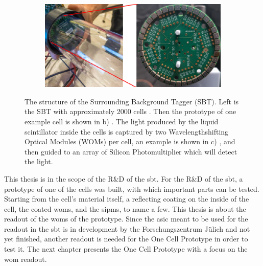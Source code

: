 \begin{figure}
\begin{subfigure}[b]{0.24\textwidth}
		\caption{}
		\label{fig:sbt_structure_cell}
	\end{subfigure}
	\begin{subfigure}[b]{0.42\textwidth}
		\centering
		\includegraphics[width=1.\textwidth]{pictures/sbt_structure_wom}
		\caption{}
		\label{fig:sbt_structure}
	\end{subfigure}
	\caption[Overview of the Surrounding Background Tagger]{The structure of the Surrounding Background Tagger (SBT). Left is the SBT with approximately 2000 cells \cite{}. Then the prototype of one example cell is shown in b) \cite{}. The light produced by the liquid scintillator inside the cells is captured by two Wavelengthshifting Optical Modules (WOMs) per cell, an example is shown in c) \cite{}, and then guided to an array of Silicon Photomultiplier which will detect the light.}
 	\label{fig:sbt}
\end{figure}

This thesis is in the scope of the R\&D of the \ac{sbt}.
For the R\&D of the \ac{sbt}, a prototype of one of the cells was built, with which important parts can be tested.
Starting from the cell's material itself, a reflecting coating on the inside of the cell, the coated \acp{wom}, and the \acp{sipm}, to name a few.
This thesis is about the readout of the \acp{wom} of the prototype.
Since the \ac{asic} meant to be used for the readout in the \ac{sbt} is in development by the Forschungszentrum Jülich and not yet finished, another readout is needed for the One Cell Prototype in order to test it.
The next chapter presents the One Cell Prototype with a focus on the \ac{wom} readout.
